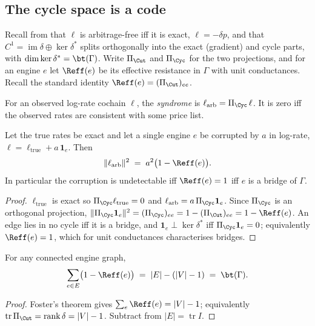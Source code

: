 \subsection{The cycle space is a code}\label{eng:S6.2}

Recall from \cite{vtok} that $\ell$ is arbitrage-free iff it is exact,
$\ell = -\delta p$, and that $C^1 = \operatorname{im}\delta \oplus
\ker\delta^\ast$ splits orthogonally into the exact (gradient) and cycle
parts, with $\dim\ker\delta^\ast = \bt(\Gamma)$. Write $\Pi_{\Cut}$ and
$\Pi_{\Cyc}$ for the two projections, and for an engine $e$ let $\Reff(e)$
be its effective resistance in $\Gamma$ with unit conductances. Recall the
standard identity $\Reff(e) = (\Pi_{\Cut})_{ee}$.

\begin{definition}[Syndrome]\label{eng:syndrome}
For an observed log-rate cochain $\ell$, the \emph{syndrome} is
$\ell_{\mathrm{arb}} = \Pi_{\Cyc}\,\ell$. It is zero iff the observed rates
are consistent with some price list.
\end{definition}

\begin{theorem}\label{eng:thm:detect}
Let the true rates be exact and let a single engine $e$ be corrupted by
$a$ in log-rate, $\ell = \ell_{\mathrm{true}} + a\,\mathbf{1}_e$. Then
\[
  \| \ell_{\mathrm{arb}} \|^2 \;=\; a^2\bigl(1 - \Reff(e)\bigr).
\]
In particular the corruption is undetectable iff $\Reff(e) = 1$ iff $e$ is
a bridge of $\Gamma$.
\end{theorem}

\begin{proof}
$\ell_{\mathrm{true}}$ is exact so $\Pi_{\Cyc}\ell_{\mathrm{true}} = 0$ and
$\ell_{\mathrm{arb}} = a\,\Pi_{\Cyc}\mathbf{1}_e$. Since $\Pi_{\Cyc}$ is an
orthogonal projection,
$\|\Pi_{\Cyc}\mathbf{1}_e\|^2 = (\Pi_{\Cyc})_{ee} = 1 - (\Pi_{\Cut})_{ee}
= 1 - \Reff(e)$. An edge lies in no cycle iff it is a bridge, and
$\mathbf{1}_e \perp \ker\delta^\ast$ iff $\Pi_{\Cyc}\mathbf{1}_e = 0$;
equivalently $\Reff(e) = 1$, which for unit conductances characterises
bridges.
\end{proof}

\begin{theorem}\label{eng:thm:foster}
For any connected engine graph,
\[
  \sum_{e \in E} \bigl(1 - \Reff(e)\bigr)
  \;=\; |E| - (|V| - 1) \;=\; \bt(\Gamma).
\]
\end{theorem}

\begin{proof}
Foster's theorem \cite{foster} gives $\sum_e \Reff(e) = |V| - 1$;
equivalently $\operatorname{tr}\Pi_{\Cut} = \operatorname{rank}\delta =
|V|-1$. Subtract from $|E| = \operatorname{tr} I$.
\end{proof}


